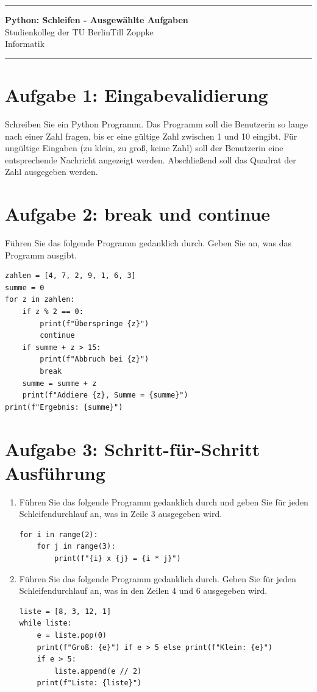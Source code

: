 \documentclass[ngerman,10pt]{article}
\date{\DTMgermanmonthname{\month} \the\year}
\begin{document}
\thispagestyle{empty}
\hrule
\begin{center}
{\large\bf Python: Schleifen - Ausgewählte Aufgaben}\\[-0mm]
Studienkolleg der TU Berlin\hfill Till Zoppke\\
Informatik \hfill \DTMgermanmonthname{\month} \the\year\\[2mm]
\end{center}
\hrule

\section*{Aufgabe 1: Eingabevalidierung}
Schreiben Sie ein Python Programm. Das Programm soll die Benutzerin so lange nach einer Zahl fragen, bis er eine gültige Zahl zwischen 1 und 10 eingibt. Für ungültige Eingaben (zu klein, zu groß, keine Zahl) soll der Benutzerin eine entsprechende Nachricht angezeigt werden. Abschließend soll das Quadrat der Zahl ausgegeben werden.

\section*{Aufgabe 2: break und continue}
Führen Sie das folgende Programm gedanklich durch. Geben Sie an, was das Programm ausgibt.
\begin{lstlisting}
zahlen = [4, 7, 2, 9, 1, 6, 3]
summe = 0
for z in zahlen:
    if z % 2 == 0:
        print(f"Überspringe {z}")
        continue
    if summe + z > 15:
        print(f"Abbruch bei {z}")
        break
    summe = summe + z
    print(f"Addiere {z}, Summe = {summe}")
print(f"Ergebnis: {summe}")
\end{lstlisting}

\section*{Aufgabe 3: Schritt-für-Schritt Ausführung}
\begin{enumerate}[label=\alph*)]

\item Führen Sie das folgende Programm gedanklich durch und geben Sie für jeden Schleifendurchlauf an, was in Zeile 3 ausgegeben wird.
\begin{lstlisting}
for i in range(2):
    for j in range(3):
        print(f"{i} x {j} = {i * j}")
\end{lstlisting}

\item Führen Sie das folgende Programm gedanklich durch. Geben Sie für jeden Schleifendurchlauf an, was in den Zeilen 4 und 6 ausgegeben wird.
\begin{lstlisting}
liste = [8, 3, 12, 1]
while liste:
    e = liste.pop(0)
    print(f"Groß: {e}") if e > 5 else print(f"Klein: {e}")
    if e > 5:
        liste.append(e // 2)
    print(f"Liste: {liste}")
\end{lstlisting}

\end{enumerate}
\end{document}
